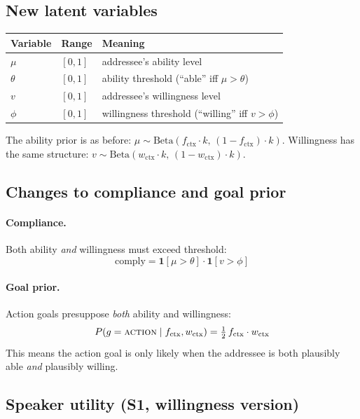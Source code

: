 \documentclass[11pt]{article}
\begin{document}
\subsection{New latent variables}

\begin{center}
\renewcommand{\arraystretch}{1.2}
\begin{tabular}{lll}
\toprule
\textbf{Variable} & \textbf{Range} & \textbf{Meaning} \\
\midrule
$\mu$ & $[0,1]$ & addressee's ability level \\
$\theta$ & $[0,1]$ & ability threshold (``able'' iff $\mu > \theta$) \\
$v$ & $[0,1]$ & addressee's willingness level \\
$\phi$ & $[0,1]$ & willingness threshold (``willing'' iff $v > \phi$) \\
\bottomrule
\end{tabular}
\end{center}

The ability prior is as before: $\mu \sim \mathrm{Beta}(f_{\text{ctx}}\cdot k,\, (1-f_{\text{ctx}})\cdot k)$.
Willingness has the same structure: $v \sim \mathrm{Beta}(w_{\text{ctx}}\cdot k,\, (1-w_{\text{ctx}})\cdot k)$.

\subsection{Changes to compliance and goal prior}

\paragraph{Compliance.} Both ability \emph{and} willingness must exceed threshold:
\[
  \text{comply} = \mathbf{1}[\mu > \theta]\cdot\mathbf{1}[v > \phi]
\]

\paragraph{Goal prior.} Action goals presuppose \emph{both} ability and willingness:
\[
  P(g = \textsc{action} \mid f_{\text{ctx}}, w_{\text{ctx}}) = \tfrac{1}{2}\,f_{\text{ctx}}\cdot w_{\text{ctx}}
\]
This means the action goal is only likely when the addressee is both plausibly
able \emph{and} plausibly willing.

\subsection{Speaker utility (S1, willingness version)}
\end{document}

